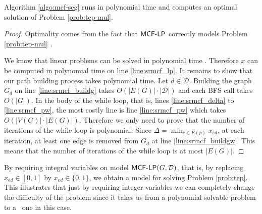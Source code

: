 \begin{proposition}
Algorithm \ref{algo:mcf-seg} runs in polynomial time and computes an optimal solution of Problem \ref{prob:tep-mul}.
\end{proposition}

\begin{proof}
Optimality comes from the fact that $\textsf{MCF-LP}$ correctly models Problem \ref{prob:tep-mul} \cite{MCF}.

We know that linear problems can be solved in polynomial time \cite{lp1, lp2}. Therefore $x$ can be computed in polynomial time on line \ref{line:srmcf_lp}.
It remains to show that our path building process takes polynomial time. Let $d \in \mathcal{D}$. Building the graph $G_d$ on line \ref{line:srmcf_buildg} takes
$O(|E(G)| \cdot |\mathcal{D}|)$ and each \textsf{BFS} call takes $O(|G|)$. In  the body of the while loop, that is, lines \ref{line:srmcf_delta}
to \ref{line:srmcf_pw}, the most costly line is line \ref{line:srmcf_pw} which takes $O(|V(G)| \cdot |E(G)|)$. Therefore we only need to prove that the number 
of iterations of the while loop is polynomial. Since $\Delta = \min_{e \in E(p)} x_{ed}$, at each iteration, at least one edge is removed from $G_d$ at
line \ref{line:srmcf_buildgw}. This means that the number of iterations of the while loop is at most $|E(G)|$.
\end{proof}

By requiring integral variables on model $\textsf{MCF-LP}(G, \mathcal{D})$, that is, by replacing $x_{ed} \in [0, 1]$  by $x_{ed} \in \{ 0, 1 \}$, we obtain 
a model for solving Problem \ref{prob:tep}. This illustrates that just by requiring integer variables we can completely change the difficulty of the problem
since it takes us from a polynomial solvable problem to a \NPhard~one in this case.


